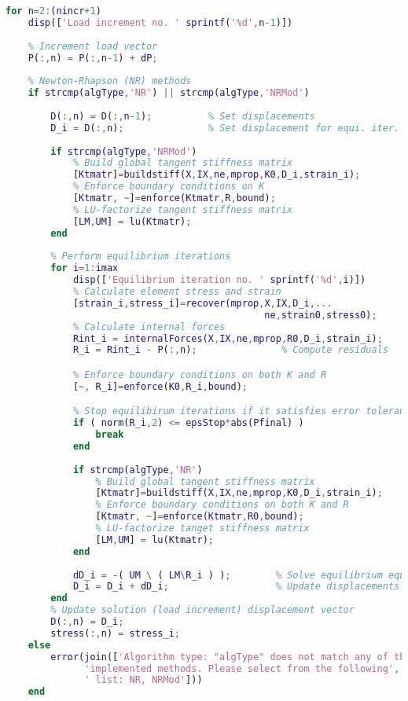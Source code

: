 \begin{lstlisting}[language=Matlab, caption = FE implementation for geometrical non-linearity, label=lst:CodeGNA]
% Loop through load increments
for n=2:(nincr+1)
    disp(['Load increment no. ' sprintf('%d',n-1)])
    
    % Increment load vector
    P(:,n) = P(:,n-1) + dP;                 
    
    % Newton-Rhapson (NR) methods
    if strcmp(algType,'NR') || strcmp(algType,'NRMod')
        
        D(:,n) = D(:,n-1);          % Set displacements
        D_i = D(:,n);               % Set displacement for equi. iter.
      
        if strcmp(algType,'NRMod')
            % Build global tangent stiffness matrix
            [Ktmatr]=buildstiff(X,IX,ne,mprop,K0,D_i,strain_i);
            % Enforce boundary conditions on K
            [Ktmatr, ~]=enforce(Ktmatr,R,bound);
            % LU-factorize tangent stiffness matrix
            [LM,UM] = lu(Ktmatr);      
        end 
            
        % Perform equilibrium iterations
        for i=1:imax
            disp(['Equilibrium iteration no. ' sprintf('%d',i)])
            % Calculate element stress and strain
            [strain_i,stress_i]=recover(mprop,X,IX,D_i,...
                                              ne,strain0,stress0);              
            % Calculate internal forces
            Rint_i = internalForces(X,IX,ne,mprop,R0,D_i,strain_i);
            R_i = Rint_i - P(:,n);               % Compute residuals

            % Enforce boundary conditions on both K and R
            [~, R_i]=enforce(K0,R_i,bound);   

            % Stop equilibirum iterations if it satisfies error tolerance
            if ( norm(R_i,2) <= epsStop*abs(Pfinal) )
                break
            end
            
            if strcmp(algType,'NR')
                % Build global tangent stiffness matrix
                [Ktmatr]=buildstiff(X,IX,ne,mprop,K0,D_i,strain_i);
                % Enforce boundary conditions on both K and R
                [Ktmatr, ~]=enforce(Ktmatr,R0,bound);   
                % LU-factorize tanget stiffness matrix
                [LM,UM] = lu(Ktmatr);       
            end
            
            dD_i = -( UM \ ( LM\R_i ) );        % Solve equilibrium equation
            D_i = D_i + dD_i;                   % Update displacements        
        end
        % Update solution (load increment) displacement vector
        D(:,n) = D_i;
        stress(:,n) = stress_i;
    else
        error(join(['Algorithm type: "algType" does not match any of the',...
              'implemented methods. Please select from the following',...
              ' list: NR, NRMod']))
    end
     

\end{lstlisting}
